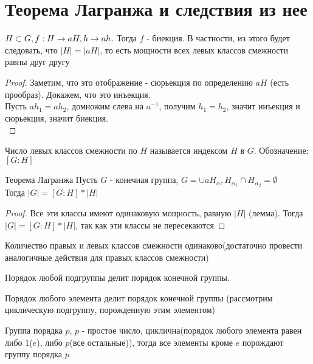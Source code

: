 \section{Теорема Лагранжа и следствия из нее}
\begin{lemma}
	$H \subset G, f: H \rightarrow aH, h \rightarrow ah$. Тогда $f$ - биекция. В частности, из этого будет следовать, что $|H| = |aH|$, то есть мощности всех левых классов смежности равны друг другу \\	
\end{lemma} 
\begin{proof}
	Заметим, что это отображение - сюрьекция по определению $aH$ (есть прообраз). Докажем, что это инъекция.  \\
	Пусть $ah_1 = ah_2$, домножим слева на $a^{-1}$, получим $h_1 = h_2$, значит инъекция и сюрьекция, значит биекция. \\
\end{proof}


\begin{Def}
	Число левых классов смежности по $H$ называется индексом $H$ в $G$. Обозначение: $[G:H]$
\end{Def}

\begin{theorem}{Теорема Лагранжа}
	Пусть $G$ - конечная группа, $G = \cup aH_{\alpha}, H_{\alpha_1} \cap H_{\alpha_2} = \emptyset$ \\
	Тогда $|G| = [G : H] * |H|$                                                                                                    \\
\end{theorem}
\begin{proof}
	Все эти классы имеют одинаковую мощность, равную $|H|$ (лемма). Тогда $|G| = [G : H] * |H|$, так как эти классы не пересекаются
\end{proof}
\begin{conseq}
	Количество правых и левых классов смежности одинаково(достаточно провести аналогичные действия для правых классов смежности)
\end{conseq}
\begin{conseq}
	Порядок любой подгруппы делит порядок конечной группы.
\end{conseq}
\begin{conseq}
	Порядок любого элемента делит порядок конечной группы (рассмотрим циклическую подгруппу, порожденную этим элементом)
\end{conseq}
\begin{conseq}
	Группа порядка $p$, $p$ - простое число, циклична(порядок любого элемента равен либо 1($e$), либо $p$(все остальные)), тогда все элементы кроме $e$ порождают группу порядка $p$ 
\end{conseq}